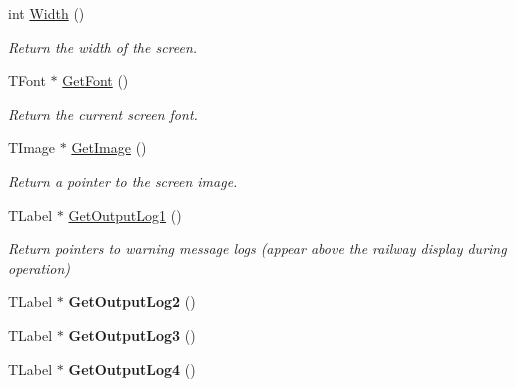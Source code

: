 \begin{DoxyCompactItemize}
\mbox{\label{class_t_display_a39cee11613d156de0d1f5df923a02c8d}} 
int \mbox{\hyperlink{class_t_display_a39cee11613d156de0d1f5df923a02c8d}{Width}} ()
\begin{DoxyCompactList}\small\item\em Return the width of the screen. \end{DoxyCompactList}\item 
\mbox{\label{class_t_display_a375ba345403e91af04392540fbd5f2f3}} 
T\+Font $\ast$ \mbox{\hyperlink{class_t_display_a375ba345403e91af04392540fbd5f2f3}{Get\+Font}} ()
\begin{DoxyCompactList}\small\item\em Return the current screen font. \end{DoxyCompactList}\item 
\mbox{\label{class_t_display_a33f7067eea9e638bdc363bd0af70d7d5}} 
T\+Image $\ast$ \mbox{\hyperlink{class_t_display_a33f7067eea9e638bdc363bd0af70d7d5}{Get\+Image}} ()
\begin{DoxyCompactList}\small\item\em Return a pointer to the screen image. \end{DoxyCompactList}\item 
\mbox{\label{class_t_display_abaab175c40149d2a4c449e9463b21a42}} 
T\+Label $\ast$ \mbox{\hyperlink{class_t_display_abaab175c40149d2a4c449e9463b21a42}{Get\+Output\+Log1}} ()
\begin{DoxyCompactList}\small\item\em Return pointers to warning message logs (appear above the railway display during operation) \end{DoxyCompactList}\item 
\mbox{\label{class_t_display_a913b1be885ac6fc291bf8367e0a8f6f0}} 
T\+Label $\ast$ {\bfseries Get\+Output\+Log2} ()
\item 
\mbox{\label{class_t_display_a1e134169a934d995afa8fc6cb2d5dba3}} 
T\+Label $\ast$ {\bfseries Get\+Output\+Log3} ()
\item 
\mbox{\label{class_t_display_aba802332a11229140ce5871c0b6cc6f7}} 
T\+Label $\ast$ {\bfseries Get\+Output\+Log4} ()

\end{DoxyCompactItemize}
